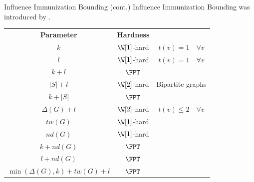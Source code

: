 \documentclass[10pt,aspectratio=169,english]{beamer}
\begin{document}
\begin{frame}{Influence Immunization Bounding (cont.)}
	Influence Immunization Bounding was introduced by \parencite{Cordasco2023}.
	\begin{center}
		\begin{tabular}{ c | c  c }
			\textbf{Parameter} & \textbf{Hardness} & \\
			$k$ & $\W[1]$-hard & $t(v)=1 \quad \forall v$ \\
			$l$ & $\W[1]$-hard & $t(v)=1 \quad \forall v$ \\
			$k+l$ & $\FPT$ &  \\
			$|S| + l$ & $\W[2]$-hard & Bipartite graphs \\
			$k+|S|$ & $\FPT$ & \\
			$\Delta(G) + l$ & $\W[2]$-hard & $t(v) \leq 2 \quad \forall v$ \\
			$tw(G)$ & $\W[1]$-hard & \\
			$nd(G)$ & $\W[1]$-hard & \\
			$k+nd(G)$ & $\FPT$ & \\
			$l+nd(G)$ & $\FPT$ & \\
			$\min(\Delta(G), k)+tw(G)+l$ & $\FPT$ & \\
		\end{tabular}
	\end{center}
	
\end{frame}
\end{document}
